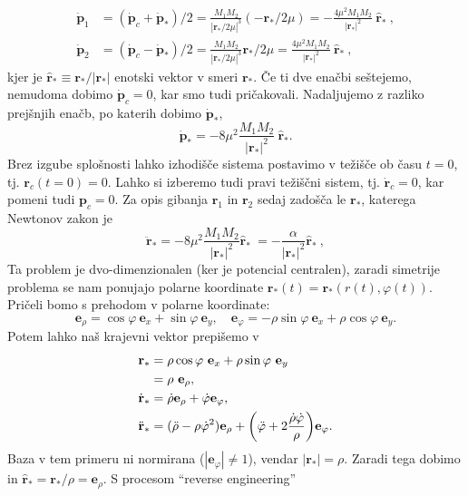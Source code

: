 \documentclass[12pt, a4paper]{article}
\renewcommand{\r}{
    \ensuremath{\mathbf{r}}
}
\newcommand{\p}{
    \ensuremath{\mathbf{p}}
}
\newcommand{\ee}{
    \ensuremath{\mathbf{e}}
}
\begin{document}
\begin{align*}
    \dot{\p}_1 &= (\dot{\p}_c + \dot{\p}_*)/2 = \frac{M_1M_2}{|\r_*/2\mu|^3}(-\r_*/2\mu)
        = -\frac{4\mu^2 M_1M_2}{|\r_*|^2}\ \hat{\r}_*\ , \\
    \dot{\p}_2 &= (\dot{\p}_c - \dot{\p}_*)/2 = \frac{M_1M_2}{|\r_*/2\mu|^3}\r_*/2\mu
        = \frac{4\mu^2 M_1M_2}{|\r_*|^2}\ \hat{\r}_*\ ,
\end{align*}
kjer je $\hat{\r}_* \equiv \r_*/|\r_*|$ enotski vektor v smeri $\r_*$. \v Ce ti dve ena\v cbi se\v stejemo, nemudoma
dobimo $\dot{\p}_c = 0$, kar smo tudi pri\v cakovali. Nadaljujemo z razliko prej\v snjih ena\v cb, po katerih
dobimo $\dot{\p}_*$,
\begin{equation*}
    \dot{\p}_* = - 8\mu^2\frac{M_1M_2}{|\r_*|^2}\ \hat{\r}_*.
\end{equation*}
Brez izgube splo\v snosti lahko izhodi\v s\v ce sistema postavimo v te\v zi\v s\v ce ob \v casu $t = 0$, tj.
$\r_c (t = 0) = 0$. Lahko si izberemo tudi pravi te\v zi\v s\v cni sistem, tj. $\dot{\r}_c = 0$, kar pomeni
tudi $\p_c = 0$. Za opis gibanja $\r_1$ in $\r_2$ sedaj zado\v s\v ca le $\r_*$, katerega Newtonov zakon je
\begin{equation}
    \ddot{\r}_* = -8\mu^2 \frac{M_1M_2}{|\r_*|^2}\hat{\r}_*\ = - \frac{\alpha}{|\r_*|^2}\hat{\r}_*\ ,
    \label{newton}
\end{equation}
Ta problem je dvo-dimenzionalen (ker je potencial centralen), zaradi simetrije problema se nam ponujajo polarne
koordinate $\r_*(t) = \r_* (r(t), \varphi(t))$. Pri\v celi bomo s prehodom v polarne koordinate:
\begin{equation}
    \ee_\rho = \cos\varphi\ \ee_x + \sin\varphi\ \ee_y, \quad \ee_\varphi = -\rho\sin\varphi\ \ee_x + \rho\cos\varphi\ \ee_y.
\end{equation}
Potem lahko na\v s krajevni vektor prepi\v semo v
\begin{align}
    \r_* &= \rho \cos\varphi\ \ee_x + \rho \sin\varphi\ \ee_y \notag \\
         &= \rho\ \ee_\rho, \\
    \dot{\r}_* &= \dot{\rho}\ee_\rho + \dot{\varphi}\ee_\varphi, \\
    \ddot{\r}_* &= (\ddot{\rho} - \rho\dot{\varphi}^2)\ee_\rho + \bigg(\ddot{\varphi} + 
        2\frac{\dot{\rho}\dot{\varphi}}{\rho}\bigg)\ee_\varphi.
    \label{polarne}
\end{align}
Baza v tem primeru ni normirana ($|\ee_\varphi| \neq 1$), vendar $|\r_*| = \rho$. Zaradi tega dobimo
in $\hat{\r}_* = \r_*/\rho = \ee_\rho$. S procesom "`reverse engineering"'
\end{document}
